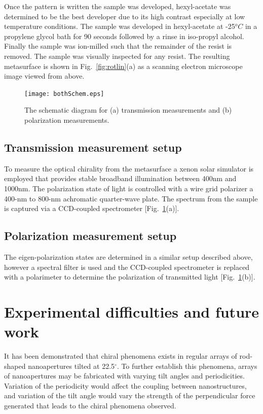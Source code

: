Once the pattern is written the sample was developed, hexyl-acetate was determined to be the best developer due to its high contrast especially at low temperature conditions. The sample was developed in hexyl-acetate at -25$^oC$ in a propylene glycol bath for 90 seconds followed by a rinse in iso-propyl alcohol.\\
Finally the sample was ion-milled such that the remainder of the resist is removed. The sample was visually inspected for any resist. The resulting metasurface is shown in Fig.~\ref{fig:rotlin}(a) as a scanning electron microscope image viewed from above. 
\begin{figure}[t!]
\centering
\texttt{[image: bothSchem.eps]}
\caption{The schematic diagram for (a) transmission measurements and (b) polarization measurements.}  
\label{fig:schematics} 
\end{figure}
\subsection{Transmission measurement setup}
To measure the optical chirality from the metasurface a xenon solar simulator is employed that provides stable broadband illumination between 400nm and 1000nm. The polarization state of light is controlled with a wire grid polarizer a 400-nm to 800-nm achromatic quarter-wave plate. The spectrum from the sample is captured via a CCD-coupled spectrometer [Fig.~\ref{fig:schematics}(a)].  

\subsection{Polarization measurement setup}
The eigen-polarization states are determined in a similar setup described above, however a spectral filter is used and the CCD-coupled spectrometer is replaced with a polarimeter to determine the polarization of transmitted light [Fig.~\ref{fig:schematics}(b)].

\section{Experimental difficulties and future work}
It has been demonstrated that chiral phenomena exists in regular arrays of rod-shaped nanoapertures tilted at 22.5$^\circ$. To further establish this phenomena, arrays of nanoapertures may be fabricated with varying tilt angles and periodicities. Variation of the periodicity would affect the coupling between nanostructures, and variation of the tilt angle would vary the strength of the perpendicular force generated that leads to the chiral phenomena observed.

